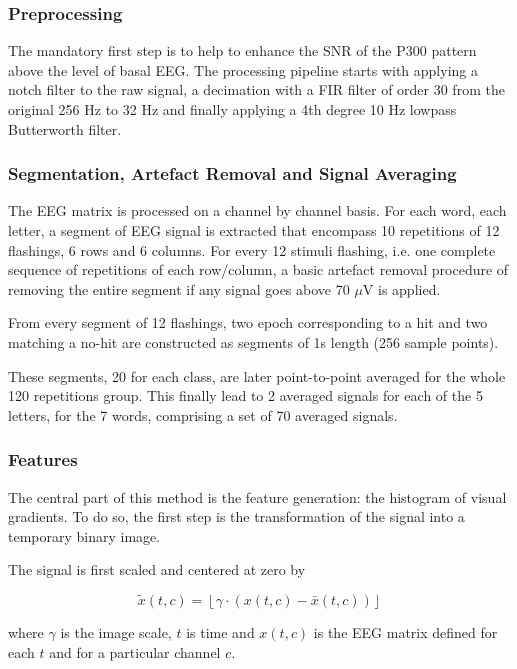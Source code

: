 \documentclass[entropy,article,submit,moreauthors,pdftex,10pt,a4paper]{mdpi}
\begin{document}
\subsubsection{Preprocessing}

The mandatory first step is to help to enhance the SNR of the P300 pattern above the level of basal EEG. The processing pipeline starts with applying a notch filter to the raw signal, a decimation with a FIR filter of order 30 from the original 256 Hz to 32 Hz and finally applying a 4th degree 10 Hz lowpass Butterworth filter.  

\subsubsection{Segmentation, Artefact Removal and Signal Averaging}

The EEG matrix is processed on a channel by channel basis.  For each word, each letter, a segment of EEG signal is extracted that encompass 10 repetitions of 12 flashings, 6 rows and 6 columns.  For every 12 stimuli flashing, i.e. one complete sequence of repetitions of each row/column, a basic artefact removal procedure of removing the entire segment if any signal goes above 70 $\mu$V is applied.

From every segment of 12 flashings, two epoch corresponding to a hit and two matching a no-hit are constructed as segments of 1s length (256 sample points).

These segments, 20 for each class, are later point-to-point averaged for the whole 120 repetitions group.  This finally lead to 2 averaged signals for each of the 5 letters, for the 7 words, comprising a set of 70 averaged signals\citep{Liang2008}.


\subsubsection{Features}

The central part of this method is the feature generation: the histogram of visual gradients.  To do so, the first step is the transformation of the signal into a temporary binary image.

The signal is first scaled and centered at zero by 

\begin{equation}
\tilde{x}(t,c) = \left \lfloor{ \gamma \cdot ( x(t,c) - \bar{x}(t,c)  )}\right \rfloor
\end{equation}

\noindent where $\gamma$ is the image scale, $t$ is time and $ x(t,c) $ is the EEG matrix defined for each $t$ and for a particular channel $c$.
\end{document}
